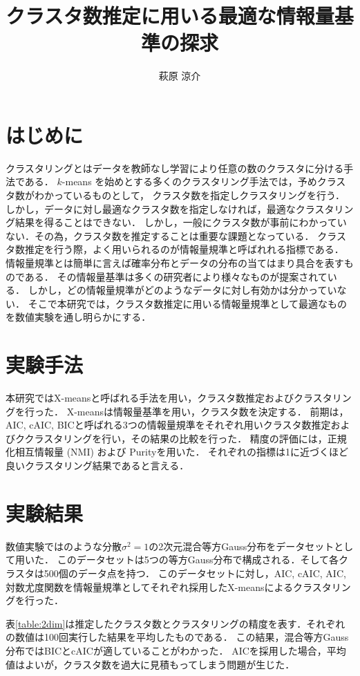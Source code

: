 \documentclass[twocolumn, 10.5pt,a4j]{ltjsarticle}
\author{萩原 涼介}
\title{クラスタ数推定に用いる最適な情報量基準の探求}
\def\tableref#1{表\ref{#1}}
\begin{document}
\maketitle

\section{はじめに}

クラスタリングとはデータを教師なし学習により任意の数のクラスタに分ける手法である．
$k$-means を始めとする多くのクラスタリング手法では，予めクラスタ数がわかっているものとして，
クラスタ数を指定しクラスタリングを行う．しかし，データに対し最適なクラスタ数を指定しなければ，最適なクラスタリング結果を得ることはできない．
しかし，一般にクラスタ数が事前にわかっていない．その為，クラスタ数を推定することは重要な課題となっている．
クラスタ数推定を行う際，よく用いられるのが情報量規準と呼ばれれる指標である．
情報量規準とは簡単に言えば確率分布とデータの分布の当てはまり具合を表すものである．
その情報量基準は多くの研究者により様々なものが提案されている．
しかし，どの情報量規準がどのようなデータに対し有効かは分かっていない．
そこで本研究では，クラスタ数推定に用いる情報量規準として最適なものを数値実験を通し明らかにする．

\section{実験手法}
本研究ではX-meansと呼ばれる手法を用い，クラスタ数推定およびクラスタリングを行った．
X-meansは情報量基準を用い，クラスタ数を決定する．
前期は，AIC, cAIC, BICと呼ばれる3つの情報量規準をそれぞれ用いクラスタ数推定およびククラスタリングを行い，その結果の比較を行った．
精度の評価には，正規化相互情報量 (NMI) および Purityを用いた．
それぞれの指標は1に近づくほど良いクラスタリング結果であると言える．

\section{実験結果}
数値実験ではのような分散$\sigma^2 = 1$の2次元混合等方Gauss分布をデータセットとして用いた．
このデータセットは5つの等方Gauss分布で構成される．そして各クラスタは500個のデータ点を持つ．
このデータセットに対し，AIC, cAIC, AIC, 対数尤度関数を情報量規準としてそれぞれ採用したX-meansによるクラスタリングを行った．

\tableref{table:2dim}は推定したクラスタ数とクラスタリングの精度を表す．それぞれの数値は100回実行した結果を平均したものである．
この結果，混合等方Gauss分布ではBICとcAICが適していることがわかった．
AICを採用した場合，平均値はよいが，クラスタ数を過大に見積もってしまう問題が生じた．
\end{document}
